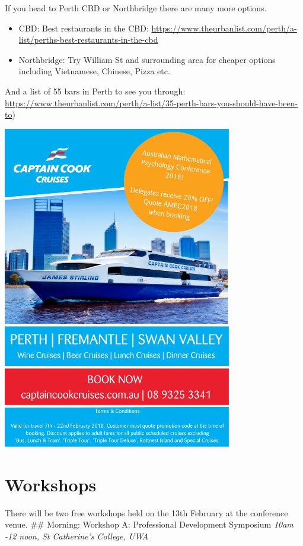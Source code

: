 \documentclass[]{article}
\providecommand{\tightlist}{%
  \setlength{\itemsep}{0pt}\setlength{\parskip}{0pt}}
\begin{document}
If you head to Perth CBD or Northbridge there are many more options.

\begin{itemize}
\tightlist
\item
  CBD: Best restaurants in the CBD:
  \url{https://www.theurbanlist.com/perth/a-list/perths-best-restaurants-in-the-cbd}
\item
  Northbridge: Try William St and surrounding area for cheaper options
  including Vietnamese, Chinese, Pizza etc.
\end{itemize}

And a list of 55 bars in Perth to see you through:
\url{https://www.theurbanlist.com/perth/a-list/35-perth-bars-you-should-have-been-to})

\begin{center}
\includegraphics[width=10cm]{images/CCC.pdf}
\end{center}

\pagebreak

\section{Workshops}\label{workshops}

There will be two free workshops held on the 13th February at the
conference venue. \#\# Morning: Workshop A: Professional Development
Symposium \emph{10am -12 noon, St Catherine's College, UWA}
\end{document}
